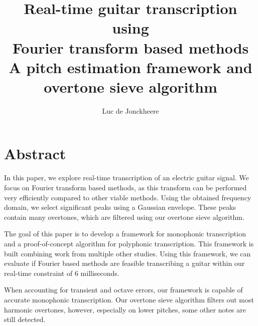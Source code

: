 \documentclass[10pt,twocolumn]{article}
\title{\textbf{Real-time guitar transcription using\\Fourier transform based methods}\\A pitch estimation framework and overtone sieve algorithm}
\author{Luc de Jonckheere}
\begin{document}

\maketitle


\section*{Abstract}
In this paper, we explore real-time transcription of an electric guitar signal. We focus on Fourier transform based methods, as this transform can be performed very efficiently compared to other viable methods. Using the obtained frequency domain, we select significant peaks using a Gaussian envelope. These peaks contain many overtones, which are filtered using our overtone sieve algorithm.

The goal of this paper is to develop a framework for monophonic transcription and a proof-of-concept algorithm for polyphonic transcription. This framework is built combining work from multiple other studies. Using this framework, we can evaluate if Fourier based methods are feasible transcribing a guitar within our real-time constraint of 6 milliseconds.

When accounting for transient and octave errors, our framework is capable of accurate monophonic transcription. Our overtone sieve algorithm filters out most harmonic overtones, however, especially on lower pitches, some other notes are still detected.

\end{document}
